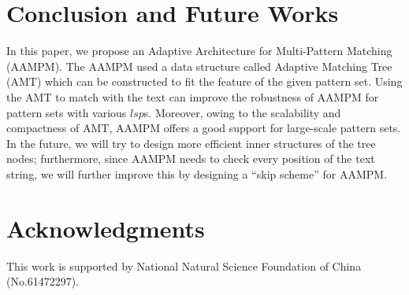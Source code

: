 \documentclass{article}
\begin{document}
\section{Conclusion and Future Works}
\label{sec:conclusion}

In this paper, we propose an Adaptive Architecture for Multi-Pattern
Matching (\textsf{AAMPM}). The \textsf{AAMPM} used a data structure
called Adaptive Matching Tree (AMT) which can be constructed to fit
the feature of the given pattern set. Using the AMT to match with the
text can improve the robustness of \textsf{AAMPM} for pattern sets
with various $lsp$s. Moreover, owing to the scalability and
compactness of AMT, \textsf{AAMPM} offers a good support for
large-scale pattern sets. In the future, we will try to design more
efficient inner structures of the tree nodes; furthermore, since
\textsf{AAMPM} needs to check every position of the text string, we
will further improve this by designing a ``skip scheme'' for
\textsf{AAMPM}.

\section{Acknowledgments}

This work is supported by National Natural Science Foundation of China
(No.61472297).


\end{document}
